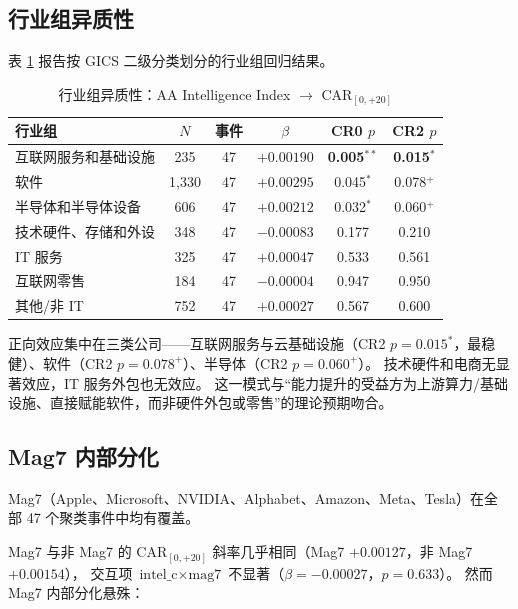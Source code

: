 \documentclass[11pt,fontset=fandol,a4paper]{ctexart}
\begin{document}
\subsection{行业组异质性}

表 \ref{tab:industry} 报告按 GICS 二级分类划分的行业组回归结果。

\begin{table}[htbp]
\centering
\caption{行业组异质性：AA Intelligence Index $\rightarrow$ $\text{CAR}_{[0,+20]}$}
\label{tab:industry}
\small
\begin{tabular}{lccccc}
\toprule
行业组 & $N$ & 事件 & $\beta$ & CR0 $p$ & CR2 $p$ \\
\midrule
互联网服务和基础设施 & 235 & 47 & $+0.00190$ & \textbf{0.005$^{**}$} & \textbf{0.015$^{*}$} \\
软件                 & 1{,}330 & 47 & $+0.00295$ & 0.045$^{*}$ & 0.078$^{+}$ \\
半导体和半导体设备   & 606 & 47 & $+0.00212$ & 0.032$^{*}$ & 0.060$^{+}$ \\
技术硬件、存储和外设 & 348 & 47 & $-0.00083$ & 0.177 & 0.210 \\
IT 服务              & 325 & 47 & $+0.00047$ & 0.533 & 0.561 \\
互联网零售           & 184 & 47 & $-0.00004$ & 0.947 & 0.950 \\
其他/非 IT           & 752 & 47 & $+0.00027$ & 0.567 & 0.600 \\
\bottomrule
\end{tabular}
\end{table}

正向效应集中在三类公司——互联网服务与云基础设施（CR2 $p=0.015^{*}$，最稳健）、软件（CR2 $p=0.078^{+}$）、半导体（CR2 $p=0.060^{+}$）。
技术硬件和电商无显著效应，IT 服务外包也无效应。
这一模式与``能力提升的受益方为上游算力/基础设施、直接赋能软件，而非硬件外包或零售''的理论预期吻合。

\subsection{Mag7 内部分化}

Mag7（Apple、Microsoft、NVIDIA、Alphabet、Amazon、Meta、Tesla）在全部 47 个聚类事件中均有覆盖。

Mag7 与非 Mag7 的 $\text{CAR}_{[0,+20]}$ 斜率几乎相同（Mag7 $+0.00127$，非 Mag7 $+0.00154$），
交互项 $\text{intel\_c}\times\text{mag7}$ 不显著（$\beta=-0.00027$，$p=0.633$）。
然而 Mag7 内部分化悬殊：
\end{document}
